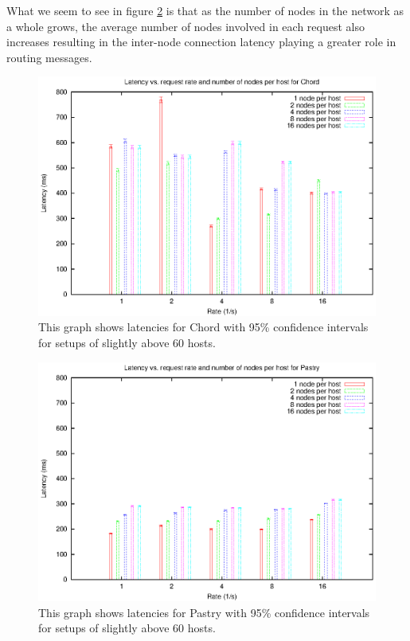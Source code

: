 What we seem to see in figure \ref{figPastryLatency} is that as the number of nodes in the network as a whole grows, the average number of nodes involved in each request also increases resulting in the inter-node connection latency playing a greater role in routing messages.

\begin{figure}[!htbp]
  \begin{center}
    \includegraphics[width=0.9\linewidth]{illustrations/latency_chord.eps}
    \caption{This graph shows latencies for Chord with 95\% confidence intervals for setups of slightly above 60 hosts.}
    \label{figChordLatency}
  \end{center}
\end{figure}

\begin{figure}[!htbp]
  \begin{center}
    \includegraphics[width=0.9\linewidth]{illustrations/latency_pastry.eps}
    \caption{This graph shows latencies for Pastry with 95\% confidence intervals for setups of slightly above 60 hosts.}
    \label{figPastryLatency}
  \end{center}
\end{figure}


